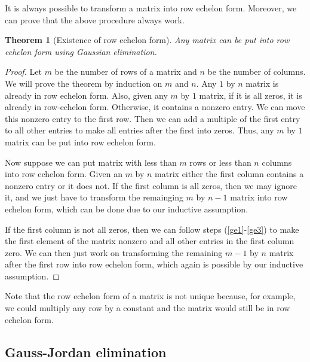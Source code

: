 \documentclass[12pt,reqno]{amsart}
\newtheorem{theorem}{Theorem}[section]
\theoremstyle{definition}
\begin{document}
It is always possible to transform a matrix into row echelon
form. Moreover, we can prove that the above procedure always work.
\begin{theorem}[Existence of row echelon form] \label{thm:ge}
  Any matrix can be put into row echelon form using Gaussian
  elimination. 
\end{theorem}
\begin{proof}
  Let $m$ be the number of rows of a matrix and $n$ be the number of
  columns. We will prove the theorem by induction on $m$ and $n$. Any
  $1$ by $n$ matrix is already in row echelon form. Also, given any
  $m$ by $1$ matrix, if it is all zeros, it is already in row-echelon
  form. Otherwise, it contains a nonzero entry. We can move this
  nonzero entry to the first row. Then we can add a multiple of the
  first entry to all other entries to make all entries after the first
  into zeros. Thus, any $m$ by $1$ matrix can be put into row echelon
  form.
  
  Now suppose we can put matrix with less than $m$ rows or less than
  $n$ columns into row echelon form. Given an $m$ by $n$ matrix either
  the first column contains a nonzero entry or it does not. If the
  first column is all zeros, then we may ignore it, and we just have
  to transform the remainging $m$ by $n-1$ matrix into row echelon
  form, which can be done due to our inductive assumption. 
  
  If the first column is not all zeros, then we can follow steps
  (\ref{ge1}-\ref{ge3}) to make the first element of the matrix
  nonzero and all other entries in the first column zero. We can then
  just work on transforming the remaining $m-1$ by $n$ matrix after
  the first row into row echelon form, which again is possible by our
  inductive assumption.
\end{proof}
Note that the row echelon form of a matrix is not unique because, for
example, we could multiply any row by a constant and the matrix would
still be in row echelon form. 

\subsection{Gauss-Jordan elimination}
\end{document}
